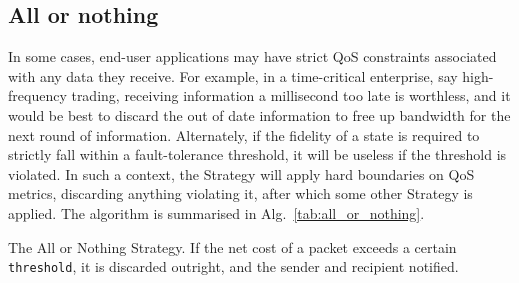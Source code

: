 \documentclass[aps,rmp,twocolumn,amsmath,amssymb,nofootinbib,superscriptaddress]{revtex4}
\begin{document}
%
%

\subsection{All or nothing} \label{sec:all_or_nothing}

In some cases, end-user applications may have strict QoS constraints associated with any data they receive. For example, in a time-critical enterprise, say high-frequency trading, receiving information a millisecond too late is worthless, and it would be best to discard the out of date information to free up bandwidth for the next round of information. Alternately, if the fidelity of a state is required to strictly fall within a fault-tolerance threshold, it will be useless if the threshold is violated. In such a context, the {\sc Strategy} will apply hard boundaries on QoS metrics, discarding anything violating it, after which some other {\sc Strategy} is applied. The algorithm is summarised in Alg.~\ref{tab:all_or_nothing}.

\begin{table}[!htb]
\caption{The {\sc All or Nothing Strategy}. If the net cost of a packet exceeds a certain {\tt threshold}, it is discarded outright, and the sender and recipient notified.} \label{tab:all_or_nothing}
\end{table}

%
%
\end{document}
